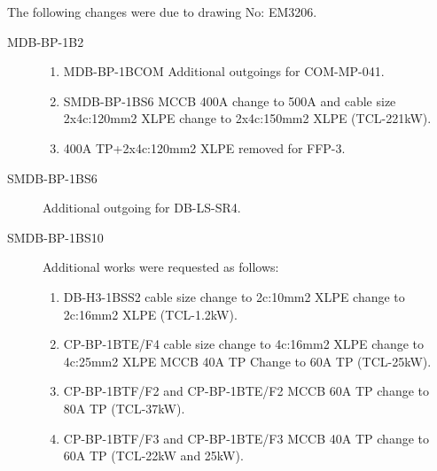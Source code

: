 The following changes were due to drawing No: EM3206.
\begin{description}
\item[MDB-BP-1B2] 
    \begin{enumerate}
       \item MDB-BP-1BCOM Additional outgoings for COM-MP-041.
       \item SMDB-BP-1BS6 MCCB 400A change to 500A and cable size 2x4c:120mm2 XLPE change to 2x4c:150mm2 XLPE (TCL-221kW).
       \item 400A TP+2x4c:120mm2 XLPE removed for FFP-3.
    \end{enumerate}
\item[SMDB-BP-1BS6] Additional outgoing for DB-LS-SR4.
\item[SMDB-BP-1BS10] Additional works were requested as follows:
    \begin{enumerate}
      \item DB-H3-1BSS2 cable size change to 2c:10mm2 XLPE change to 2c:16mm2 XLPE (TCL-1.2kW).
      \item CP-BP-1BTE/F4 cable size change to 4c:16mm2 XLPE change to 4c:25mm2 XLPE MCCB 40A TP Change to 60A TP (TCL-25kW).
      \item CP-BP-1BTF/F2 and CP-BP-1BTE/F2 MCCB 60A TP change to 80A TP (TCL-37kW).
      \item CP-BP-1BTF/F3 and CP-BP-1BTE/F3 MCCB 40A TP change to 60A TP (TCL-22kW and 25kW).
    \end{enumerate}
\end{description}








